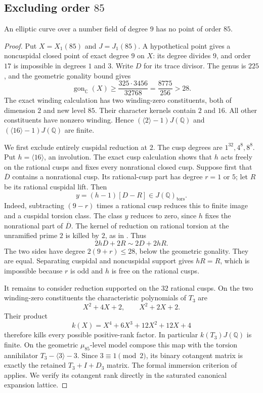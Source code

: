 \subsection{Excluding order $85$}
\begin{proposition}\label{prop:nonic85-exclusion}
An elliptic curve over a number field of degree $9$ has no point of order $85$.
\end{proposition}
\begin{proof}
Put $X=X_1(85)$ and $J=J_1(85)$. A hypothetical point gives a noncuspidal closed point of exact degree $9$ on $X$: its degree divides $9$, and order $17$ is impossible in degrees $1$ and $3$. Write $D$ for its trace divisor. The genus is $225$, and the geometric gonality bound gives
\[
 \operatorname{gon}_{\mathbb C}(X)\geq\frac{325\cdot3456}{32768}
 =\frac{8775}{256}>28.
\]
The exact winding calculation has two winding-zero constituents, both of dimension $2$ and new level $85$. Their character kernels contain $2$ and $16$. All other constituents have nonzero winding. Hence $(\langle2\rangle-1)J(\mathbb Q)$ and $(\langle16\rangle-1)J(\mathbb Q)$ are finite.

We first exclude entirely cuspidal reduction at $2$. The cusp degrees are $1^{32},4^8,8^8$. Put $h=\langle16\rangle$, an involution. The exact cusp calculation shows that $h$ acts freely on the rational cusps and fixes every nonrational closed cusp. Suppose first that $\overline D$ contains a nonrational cusp. Its rational-cusp part has degree $r=1$ or $5$; let $R$ be its rational cuspidal lift. Then
\[
 y=(h-1)[D-R]\in J(\mathbb Q)_{\mathrm{tors}}.
\]
Indeed, subtracting $(9-r)$ times a rational cusp reduces this to finite image and a cuspidal torsion class. The class $y$ reduces to zero, since $h$ fixes the nonrational part of $\overline D$. The kernel of reduction on rational torsion at the unramified prime $2$ is killed by $2$, as in \cite[proof of Proposition~3.4]{DKSS}. Thus
\[
 2hD+2R\sim2D+2hR.
\]
The two sides have degree $2(9+r)\leq28$, below the geometric gonality. They are equal. Separating cuspidal and noncuspidal support gives $hR=R$, which is impossible because $r$ is odd and $h$ is free on the rational cusps.

It remains to consider reduction supported on the $32$ rational cusps. On the two winding-zero constituents the characteristic polynomials of $T_3$ are
\[
 X^2+4X+2,\qquad X^2+2X+2.
\]
Their product
\[
 k(X)=X^4+6X^3+12X^2+12X+4
\]
therefore kills every possible positive-rank factor. In particular $k(T_3)J(\mathbb Q)$ is finite. On the geometric $\mu_{85}$-level model compose this map with the torsion annihilator $T_3-\langle3\rangle-3$. Since $3\equiv1\pmod2$, its binary cotangent matrix is exactly the retained $T_3+I+D_3$ matrix. The formal immersion criterion of \cite[Corollaries~4.4 and~5.2, Proposition~5.3]{DKSS} applies. We verify its cotangent rank directly in the saturated canonical expansion lattice.


\end{proof}
